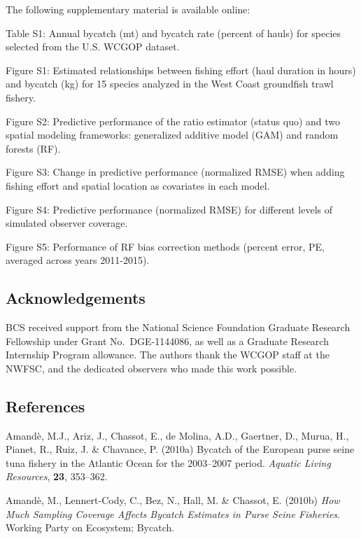 \documentclass[]{article}
\begin{document}
The following supplementary material is available online:

Table S1: Annual bycatch (mt) and bycatch rate (percent of hauls) for
species selected from the U.S. WCGOP dataset.

Figure S1: Estimated relationships between fishing effort (haul duration
in hours) and bycatch (kg) for 15 species analyzed in the West Coast
groundfish trawl fishery.

Figure S2: Predictive performance of the ratio estimator (status quo)
and two spatial modeling frameworks: generalized additive model (GAM)
and random forests (RF).

Figure S3: Change in predictive performance (normalized RMSE) when
adding fishing effort and spatial location as covariates in each model.

Figure S4: Predictive performance (normalized RMSE) for different levels
of simulated observer coverage.

Figure S5: Performance of RF bias correction methods (percent error, PE,
averaged across years 2011-2015).

\hypertarget{acknowledgements}{%
\subsection{Acknowledgements}\label{acknowledgements}}

BCS received support from the National Science Foundation Graduate
Research Fellowship under Grant No.~DGE-1144086, as well as a Graduate
Research Internship Program allowance. The authors thank the WCGOP staff
at the NWFSC, and the dedicated observers who made this work possible.

\hypertarget{references}{%
\subsection{References}\label{references}}

\hypertarget{refs}{}
\leavevmode\hypertarget{ref-amande2010a}{}%
Amandè, M.J., Ariz, J., Chassot, E., de Molina, A.D., Gaertner, D.,
Murua, H., Pianet, R., Ruiz, J. \& Chavance, P. (2010a) Bycatch of the
European purse seine tuna fishery in the Atlantic Ocean for the
2003--2007 period. \emph{Aquatic Living Resources}, \textbf{23},
353--362.

\leavevmode\hypertarget{ref-amande2010b}{}%
Amandè, M., Lennert-Cody, C., Bez, N., Hall, M. \& Chassot, E. (2010b)
\emph{How Much Sampling Coverage Affects Bycatch Estimates in Purse
Seine Fisheries}. Working Party on Ecosystem; Bycatch.
\end{document}
